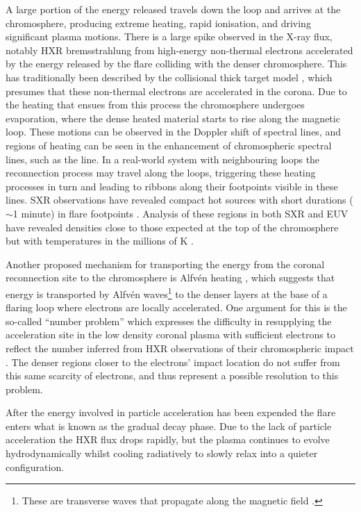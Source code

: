 A large portion of the energy released travels down the loop and arrives at the chromosphere, producing extreme heating, rapid ionisation, and driving significant plasma motions.
There is a large spike observed in the X-ray flux, notably HXR bremsstrahlung from high-energy non-thermal electrons accelerated by the energy released by the flare colliding with the denser chromosphere.
This has traditionally been described by the collisional thick target model \citep{Brown1971,Hudson1972}, which presumes that these non-thermal electrons are accelerated in the corona.
Due to the heating that ensues from this process the chromosphere undergoes evaporation, where the dense heated material starts to rise along the magnetic loop.
These motions can be observed in the Doppler shift of spectral lines, and regions of heating can be seen in the enhancement of chromospheric spectral lines, such as the \Ha{} line.
In a real-world system with neighbouring loops the reconnection process may travel along the loops, triggering these heating processes in turn and leading to ribbons along their footpoints visible in these lines.
SXR observations have revealed compact hot sources with short durations ($\sim$1 minute) in flare footpoints \citep{Hudson1994}.
Analysis of these regions in both SXR and EUV have revealed densities close to those expected at the top of the chromosphere but with temperatures in the millions of \si{\kelvin} \citep{Mrozek2004,Graham2013,Simoes2015}.

Another proposed mechanism for transporting the energy from the coronal reconnection site to the chromosphere is Alfvén heating \citep{Emslie1982, Fletcher2007}, which suggests that energy is transported by Alfvén waves\footnote{These  are transverse waves that propagate along the magnetic field \citep[e.g.][]{TandbergHanssen1988}.} to the denser layers at the base of a flaring loop where electrons are locally accelerated.
One argument for this is the so-called ``number problem'' which expresses the difficulty in resupplying the acceleration site in the low density coronal plasma with sufficient electrons to reflect the number inferred from HXR observations of their chromospheric impact \citep[e.g.][]{Simoes2013}.
The denser regions closer to the electrons' impact location do not suffer from this same scarcity of electrons, and thus represent a possible resolution to this problem.

After the energy involved in particle acceleration has been expended the flare enters what is known as the gradual decay phase.
Due to the lack of particle acceleration the HXR flux drops rapidly, but the plasma continues to evolve hydrodynamically whilst cooling radiatively to slowly relax into a quieter configuration.


